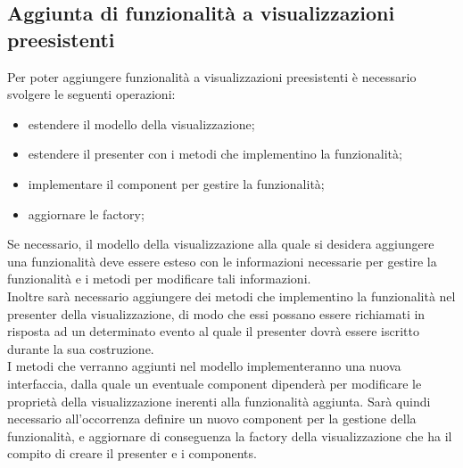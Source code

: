 \documentclass[../manuale_sviluppatore.tex]{subfiles}
\begin{document}
\subsection{Aggiunta di funzionalità a visualizzazioni preesistenti}
\label{sub:funzionalita}

Per poter aggiungere funzionalità a visualizzazioni preesistenti è necessario svolgere le seguenti 
operazioni:
\begin{itemize}
	\item estendere il modello della visualizzazione;
	\item estendere il presenter con i metodi che implementino la funzionalità;
	\item implementare il component per gestire la funzionalità;
	\item aggiornare le factory;
\end{itemize}

Se necessario, il modello della visualizzazione alla quale si desidera aggiungere una 
funzionalità deve essere esteso con le informazioni necessarie per gestire la funzionalità e i 
metodi per modificare tali informazioni.\\

Inoltre sarà necessario aggiungere dei metodi che implementino la funzionalità nel presenter della 
visualizzazione, di modo che essi possano essere richiamati in risposta ad un determinato evento al 
quale il presenter dovrà essere iscritto durante la sua costruzione.\\

I metodi che verranno aggiunti nel modello implementeranno una nuova interfaccia, dalla quale un 
eventuale component dipenderà per modificare le proprietà della visualizzazione inerenti alla 
funzionalità aggiunta. Sarà quindi necessario all'occorrenza definire un nuovo component per la 
gestione della funzionalità, e aggiornare di conseguenza la factory della visualizzazione che ha il 
compito di creare il presenter e i components.
\end{document}
